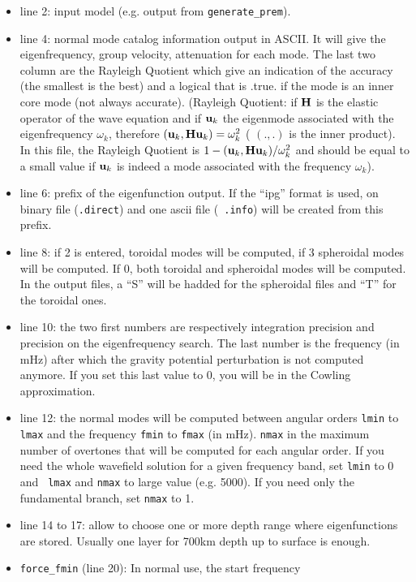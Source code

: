 \documentclass[11pt]{article}
\begin{document}
\begin{itemize}	
\item line 2: input model (e.g. output from {\tt generate\_prem}). 
\item line 4: normal mode catalog information output in ASCII.
It will give the eigenfrequency, group velocity, attenuation for each
mode. The last two column are the Rayleigh Quotient which give an
indication of the accuracy (the smallest is the best) and a logical
that is .true. if the mode is an inner core mode (not always
accurate). (Rayleigh Quotient: if $\bold{H}$ is the elastic operator of the
wave equation and if $\bold{u}_k$ the eigenmode associated with the
eigenfrequency $\omega_k$, therefore $(\bold{u}_k,\bold{H}\bold{u}_k)=\omega_k^2$ (
$(.,.)$ is  the inner product). In
this file, the Rayleigh Quotient is $1-(\bold{u}_k,\bold{H}\bold{u}_k)/\omega_k^2$ 
and should be equal to a small value if $\bold{u}_k$ is indeed a mode 
associated with the frequency $\omega_k$). 
\item line 6: prefix of the eigenfunction output. If the ``ipg''
format is used, on binary file ({\tt .direct}) and one ascii file ({\tt
.info}) will be created from this prefix.
\item line 8: if 2 is entered, toroidal modes will be computed, if 3
spheroidal modes will be computed. If 0, both toroidal and spheroidal
modes will be computed. In the output files, a ``S'' will be hadded
for the spheroidal files and ``T'' for the toroidal ones.
\item line 10: the two first numbers are respectively integration
precision and precision on the eigenfrequency search. The last number
is the frequency (in mHz) after which the gravity potential
perturbation is not computed anymore. If you set this last value to 0,
you will be in the Cowling approximation.
\item line 12: the normal modes will be computed between  angular orders
{\tt lmin} to {\tt lmax} and the frequency {\tt fmin} to {\tt fmax} (in
mHz). {\tt nmax} in the maximum number of overtones that will be
computed for each angular order. If you need the whole wavefield
solution for a given frequency band, set {\tt lmin} to 0 and {\tt
lmax} and {\tt nmax} to large value (e.g. 5000). If you need only the
fundamental branch,  set {\tt nmax} to 1.
\item line 14 to 17: allow to choose one or more depth range where
eigenfunctions are stored. Usually one layer for 700km depth
up to surface is enough.
\item {\tt force\_fmin} (line 20): In normal use, the start frequency

\end{itemize}
\end{document}

